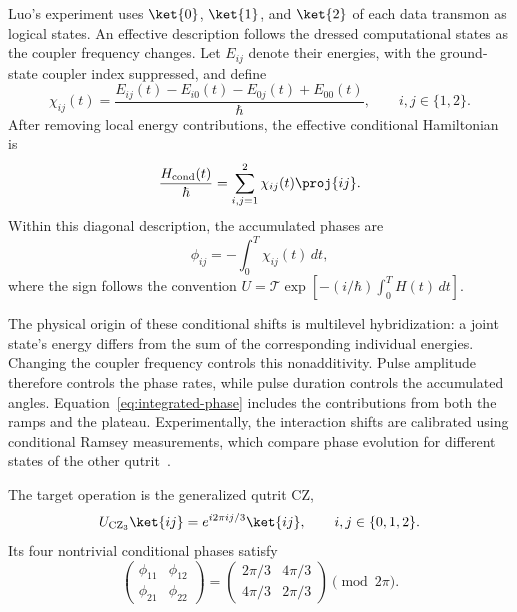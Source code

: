 Luo's experiment uses $\ket{0}$, $\ket{1}$, and $\ket{2}$ of each
data transmon as logical states. An effective description follows
the dressed computational states as the coupler frequency changes.
Let $E_{ij}$ denote their energies, with the ground-state coupler
index suppressed, and define
\begin{equation}
    \chi_{ij}(t)
    =
    \frac{
        E_{ij}(t)-E_{i0}(t)-E_{0j}(t)+E_{00}(t)
    }{\hbar},
    \qquad i,j\in\{1,2\}.
    \label{eq:cross-kerr}
\end{equation}
After removing local energy contributions, the effective
conditional Hamiltonian is
\begin{equation}
    \frac{H_{\mathrm{cond}}(t)}{\hbar}
    =
    \sum_{i,j=1}^{2}
    \chi_{ij}(t)\proj{ij}.
\end{equation}
Within this diagonal description, the accumulated phases are
\begin{equation}
    \phi_{ij}
    =-\int_0^T\chi_{ij}(t)\,dt,
    \label{eq:integrated-phase}
\end{equation}
where the sign follows the convention
$U=\mathcal{T}\exp[-(i/\hbar)\int_0^T H(t)\,dt]$.

The physical origin of these conditional shifts is multilevel
hybridization: a joint state's energy differs from the sum of
the corresponding individual energies. Changing the coupler
frequency controls this nonadditivity. Pulse amplitude therefore
controls the phase rates, while pulse duration controls the
accumulated angles. Equation~\eqref{eq:integrated-phase} includes
the contributions from both the ramps and the plateau.
Experimentally, the interaction shifts are calibrated using
conditional Ramsey measurements, which compare phase evolution
for different states of the other qutrit~\cite{Luo2023}.

The target operation is the generalized qutrit CZ,
\begin{equation}
    U_{\mathrm{CZ}_3}\ket{ij}
    =e^{i2\pi ij/3}\ket{ij},
    \qquad i,j\in\{0,1,2\}.
\end{equation}
Its four nontrivial conditional phases satisfy
\begin{equation}
    \begin{pmatrix}
        \phi_{11} & \phi_{12}\\
        \phi_{21} & \phi_{22}
    \end{pmatrix}
    =
    \begin{pmatrix}
        2\pi/3 & 4\pi/3\\
        4\pi/3 & 2\pi/3
    \end{pmatrix}
    \pmod{2\pi}.
    \label{eq:qutrit-target}
\end{equation}

